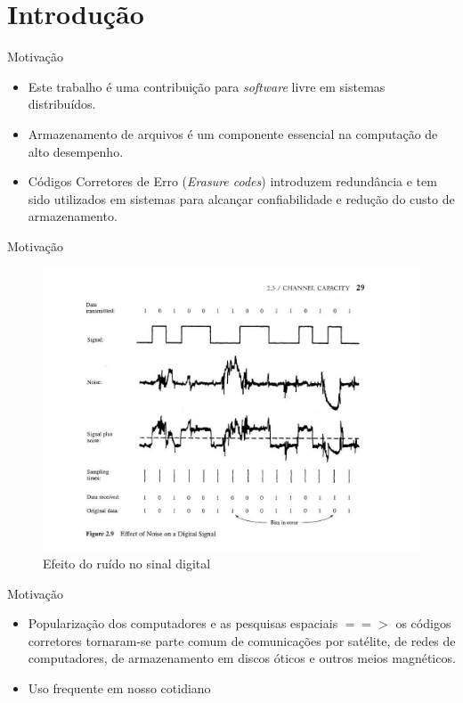  \section{Introdução}

  \begin{frame}{Motivação}
     \begin{itemize}
      \item Este trabalho é uma contribuição para \emph{software} livre em sistemas distribuídos.
      \item Armazenamento de arquivos é um componente essencial na computação de alto desempenho. 
      \item Códigos Corretores de Erro (\emph{Erasure codes}) introduzem redundância e tem sido utilizados em sistemas para alcançar confiabilidade e redução do custo de armazenamento.    
     \end{itemize}
  \end{frame}

  \begin{frame}{Motivação}
   \begin{figure}[h]
     \centering
     \includegraphics[scale=.25]{stalling-channel-capacity.jpg}
     \caption{Efeito do ruído no sinal digital \cite{Plank:2004}}
     \label{fig1:ersd}
   \end{figure}
  \end{frame}

  \begin{frame}{Motivação}
     \begin{itemize}
         \item Popularização dos computadores e as pesquisas espaciais $==>$ os códigos corretores tornaram-se parte comum de comunicações por satélite, de redes de computadores, de armazenamento em discos óticos e outros meios magnéticos.
         \item Uso frequente em nosso cotidiano
     \end{itemize}
  \end{frame}

